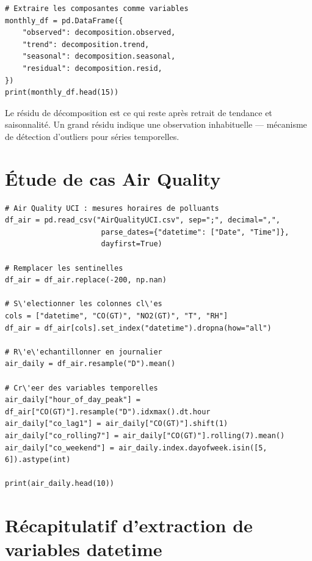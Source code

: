 \begin{verbatim}
# Extraire les composantes comme variables
monthly_df = pd.DataFrame({
    "observed": decomposition.observed,
    "trend": decomposition.trend,
    "seasonal": decomposition.seasonal,
    "residual": decomposition.resid,
})
print(monthly_df.head(15))
\end{verbatim}

\begin{preprocesstip}
Le r\'esidu de d\'ecomposition est ce qui reste apr\`es retrait de tendance et saisonnalit\'e. Un grand r\'esidu indique une observation inhabituelle --- m\'ecanisme de d\'etection d'outliers pour s\'eries temporelles.
\end{preprocesstip}

\section{\'Etude de cas Air Quality}

\begin{verbatim}
# Air Quality UCI : mesures horaires de polluants
df_air = pd.read_csv("AirQualityUCI.csv", sep=";", decimal=",",
                      parse_dates={"datetime": ["Date", "Time"]},
                      dayfirst=True)

# Remplacer les sentinelles
df_air = df_air.replace(-200, np.nan)

# S\'electionner les colonnes cl\'es
cols = ["datetime", "CO(GT)", "NO2(GT)", "T", "RH"]
df_air = df_air[cols].set_index("datetime").dropna(how="all")

# R\'e\'echantillonner en journalier
air_daily = df_air.resample("D").mean()

# Cr\'eer des variables temporelles
air_daily["hour_of_day_peak"] = df_air["CO(GT)"].resample("D").idxmax().dt.hour
air_daily["co_lag1"] = air_daily["CO(GT)"].shift(1)
air_daily["co_rolling7"] = air_daily["CO(GT)"].rolling(7).mean()
air_daily["co_weekend"] = air_daily.index.dayofweek.isin([5, 6]).astype(int)

print(air_daily.head(10))
\end{verbatim}

\section{R\'ecapitulatif d'extraction de variables datetime}

